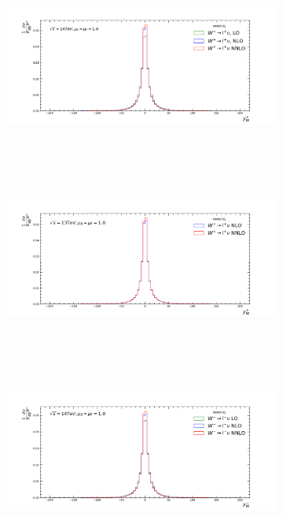 \begin{figure}[H]
\centering
\begin{subfigure}{0.49\textwidth}
\includegraphics[height=6cm ,width=\textwidth]{chapter4/WpY14.pdf}
\vspace*{-8mm}
\caption{}
\label{wpy14}
\end{subfigure}
\begin{subfigure}{0.49\textwidth}
\includegraphics[height=6cm, width=\textwidth]{chapter4/WpY13.pdf}
\vspace*{-8mm}
\caption{}
\label{wpy13}
\end{subfigure}
\begin{subfigure}{0.49\textwidth}
\includegraphics[height=6cm, width=\textwidth]{chapter4/WmY14.pdf}
\vspace*{-8mm}
\caption{}

\end{subfigure}
\end{figure}
